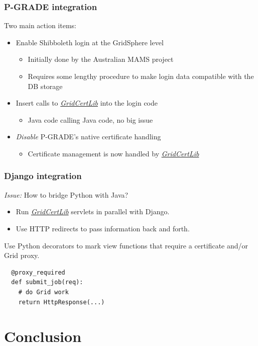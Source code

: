 \documentclass{beamer}
\newcommand{\+}{\vspace{1em}}
\newcommand{\GridCertLib}{\href{http://gridcertlib.googlecode.com/}{{\em GridCertLib}}}
\begin{document}
\begin{frame}[label=pgrade]
  \frametitle{P-GRADE integration}

  Two main action items:
  \begin{itemize}
  \item Enable Shibboleth login at the GridSphere level
    \begin{itemize}
    \item Initially done by the Australian MAMS project
    \item Requires some lengthy procedure to make login data
      compatible with the DB storage
    \end{itemize}
  \item Insert calls to \GridCertLib{} into the login code
    \begin{itemize}
    \item Java code calling Java code, no big issue
    \end{itemize}
  \item \emph{Disable} P-GRADE's native certificate handling
    \begin{itemize}
    \item Certificate management is now handled by \GridCertLib{}
    \end{itemize}
  \end{itemize}

  \hyperlink{more-pgrade}{}
\end{frame}


\begin{frame}[fragile]
  \frametitle{Django integration}

  \emph{Issue:} How to bridge Python with Java?
  \begin{itemize}
  \item Run \GridCertLib{} servlets in parallel with Django.
  \item Use HTTP redirects to pass information back and forth.
  \end{itemize}

  \+
  Use Python decorators to mark view functions that require a
  certificate and/or Grid proxy.
\begin{verbatim}
  @proxy_required
  def submit_job(req):
    # do Grid work
    return HttpResponse(...)
\end{verbatim}

\end{frame}


\section{Conclusion}
\label{sec:conclusion}
\end{document}

